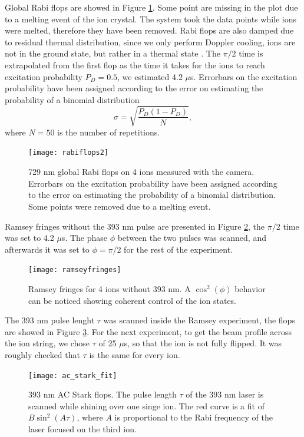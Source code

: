 Global Rabi flops are showed in Figure \ref{rabiflops4}. Some point are missing in the plot due to a melting event of the ion crystal. The system took the data points while ions were melted, therefore they have been removed. Rabi flops are also damped due to residual thermal distribution, since we only perform Doppler cooling, ions are not in the ground state, but rather in a thermal state \cite{ross}. The $\pi/2$ time is extrapolated from the first flop as the time it takes for the ions to reach excitation probability $P_D = 0.5$, we estimated 4.2 $\mu$s. Errorbars on the excitation probability have been assigned according to the error on estimating the probability of a binomial distribution \cite{mle}
\begin{equation}
\sigma = \sqrt{\frac{P_{D}(1-P_{D})}{N}},
\end{equation}
where $N = 50$ is the number of repetitions.
\begin{figure}
\centering
\texttt{[image: rabiflops2]}
\caption{729 nm global Rabi flops on 4 ions measured with the camera. Errorbars on the excitation probability have been assigned according to the error on estimating the probability of a binomial distribution. Some points were removed due to a melting event.}
\label{rabiflops4}
\end{figure}
Ramsey fringes without the 393 nm pulse are presented in Figure \ref{ramseyfringes}, the $\pi/2$ time was set to 4.2 $\mu$s. The phase $\phi$ between the two pulses was scanned, and afterwards it was set to $\phi = \pi/2$ for the rest of the experiment.
\begin{figure}[H]
\centering
\texttt{[image: ramseyfringes]}
\caption{Ramsey fringes for 4 ions without 393 nm. A $\cos^2(\phi)$ behavior can be noticed showing coherent control of the ion states.}
\label{ramseyfringes}
\end{figure}
The 393 nm pulse lenght $\tau$ was scanned inside the Ramsey experiment, the flops are showed in Figure \ref{ACscan}. For the next experiment, to get the beam profile across the ion string, we chose $\tau$ of 25 $\mu$s, so that the ion is not fully flipped. It was roughly checked that $\tau$ is the same for every ion.
\begin{figure}[H]
\centering
\texttt{[image: ac\_stark\_fit]}
\caption{393 nm AC Stark flops. The pulse length $\tau$ of the 393 nm laser is scanned while shining over one singe ion. The red curve is a fit of $B\sin^2(A\tau)$, where $A$ is proportional to the Rabi frequency of the laser focused on the third ion.}
\label{ACscan}
\end{figure}
